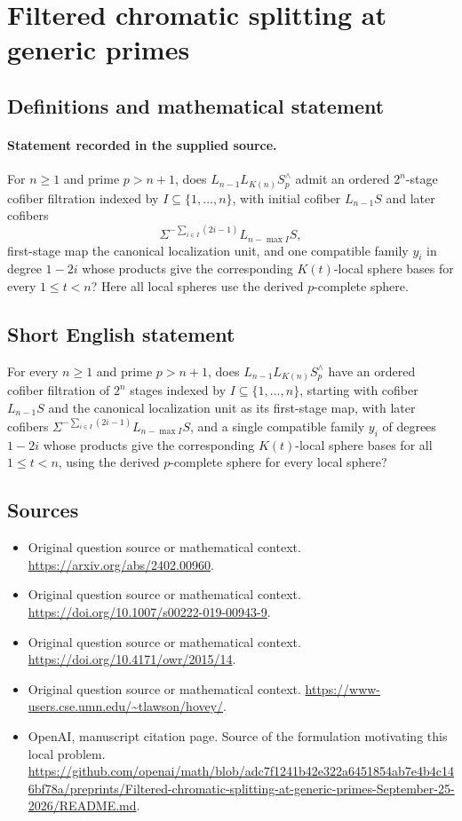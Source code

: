 \documentclass[11pt]{article}
\begin{document}
\section*{Filtered chromatic splitting at generic primes}\label{30007502}
\subsection{Definitions and mathematical statement}
\paragraph{Statement recorded in the supplied source.}
For $n\geq1$ and prime $p>n+1$, does $L_{n-1}L_{K(n)}S_p^\wedge$ admit an ordered $2^n$-stage cofiber filtration indexed by $I\subseteq\{1,\ldots,n\}$, with initial cofiber $L_{n-1}S$ and later cofibers
\[
\Sigma^{-\sum_{i\in I}(2i-1)}L_{n-\max I}S,
\]
first-stage map the canonical localization unit, and one compatible family $y_i$ in degree $1-2i$ whose products give the corresponding $K(t)$-local sphere bases for every $1\leq t<n$? Here all local spheres use the derived $p$-complete sphere.
\subsection{Short English statement}
For every $n\geq1$ and prime $p>n+1$, does $L_{n-1}L_{K(n)}S_p^\wedge$ have an ordered cofiber filtration of $2^n$ stages indexed by $I\subseteq\{1,\ldots,n\}$, starting with cofiber $L_{n-1}S$ and the canonical localization unit as its first-stage map, with later cofibers $\Sigma^{-\sum_{i\in I}(2i-1)}L_{n-\max I}S$, and a single compatible family $y_i$ of degrees $1-2i$ whose products give the corresponding $K(t)$-local sphere bases for all $1\leq t<n$, using the derived $p$-complete sphere for every local sphere?
\subsection{Sources}
\begin{itemize}
\item[S1] Original question source or mathematical context.
\url{https://arxiv.org/abs/2402.00960}.
\item[S2] Original question source or mathematical context.
\url{https://doi.org/10.1007/s00222-019-00943-9}.
\item[S3] Original question source or mathematical context.
\url{https://doi.org/10.4171/owr/2015/14}.
\item[S4] Original question source or mathematical context.
\url{https://www-users.cse.umn.edu/~tlawson/hovey/}.
\item[S5] OpenAI, manuscript citation page. Source of the formulation motivating this local problem.
\url{https://github.com/openai/math/blob/adc7f1241b42e322a6451854ab7e4b4c146bf78a/preprints/Filtered-chromatic-splitting-at-generic-primes-September-25-2026/README.md}.
\end{itemize}
\end{document}
